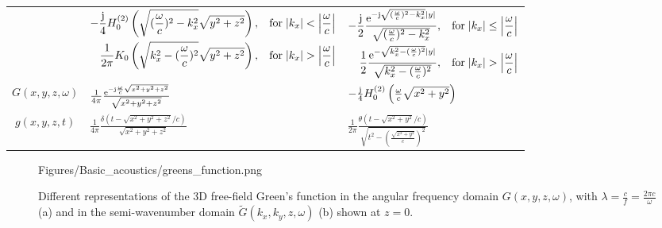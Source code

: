 \begin{table}
\begin{tabular}{  c | | l |	 l }
    &      
    \scriptsize
    $\begin{aligned}[t] %
	-\frac{\ti}{4} H_0^{(2)}\left( \sqrt{(\frac{\omega}{c})^2 - k_x^2 } \sqrt{y^2+z^2} \right),\hspace{3mm} \text{for} \hspace{1mm}|k_x|<\left| \frac{\omega}{c} \right| \\ \frac{1}{2\pi} K_0\left( \sqrt{k_x^2 - (\frac{\omega}{c})^2 } \sqrt{y^2+z^2} \right),\hspace{3mm}  \text{for} \hspace{1mm}|k_x|>\left| \frac{\omega}{c} \right| 
	\end{aligned}$ \normalsize
     &     
     \scriptsize	$\begin{aligned}[t]
	-\frac{\ti}{2}\frac{\te^{-\ti\sqrt{(\frac{\omega}{c})^2 - k_x^2 }|y|}}{\sqrt{(\frac{\omega}{c})^2 - k_x^2 }},\hspace{3mm} \text{for} \hspace{1mm}|k_x|		\leq			\left| \frac{\omega}{c} \right| \\
	\frac{1}{2}\frac{\te^{- \sqrt{k_x^2 -(\frac{\omega}{c})^2}|y|}}{\sqrt{k_x^2 -(\frac{\omega}{c})^2}},\hspace{3mm}  \text{for} \hspace{1mm}|k_x|>\left| 					\frac{\omega}{c} \right| 
	\end{aligned}$ \normalsize      \\ 
    $G(x,y,z,\omega)$ 				 &  $\frac{1}{4\pi}\frac{\mathrm{e}^{-\mathrm{j}\frac{\omega}{c}\sqrt{x^2+y^2+z^2}}}{\sqrt{x^2+y^2+z^2}}$ & \scriptsize$-\frac{\mathrm{j}}{4} H_0^{(2)}\left( \frac{\omega}{c} \sqrt{x^2+y^2} \right) $\normalsize  \\ 
    $g(x,y,z,t)$ 					 &  $\frac{1}{4\pi}\frac{\delta\left( t - \sqrt{x^2+y^2+z^2}/c \right)}{\sqrt{x^2+y^2+z^2}}$  & $\frac{1}{2\pi}\frac{\theta(t - \sqrt{x^2+y^2}/c)}{\sqrt{t^2 - \left(\frac{\sqrt{x^2+y^2}}{c}\right)^2}}$
    \end{tabular}
\end{table}


\begin{figure}
	\centering
	\begin{overpic}[width = .95\columnwidth]{Figures/Basic_acoustics/greens_function.png}
	\small
	\end{overpic}
	\caption{Different representations of the 3D free-field Green's function in the angular frequency domain $G(x,y,z,\omega)$, with $\lambda = \frac{c}{f} = \frac{2\pi c}{\omega}$ (a) and in the semi-wavenumber domain $\tilde{G}(k_x,k_y,z,\omega)$ (b) shown at $z=0$.}
	\label{Fig:Theory:Greens_function}
\end{figure}

